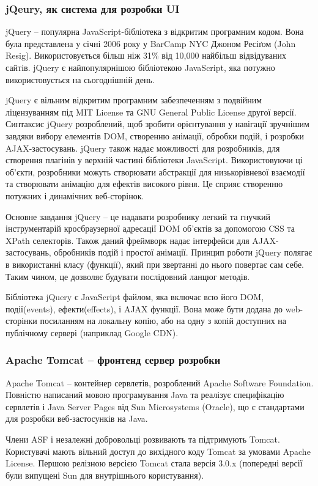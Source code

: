 \subsubsection{jQeury, як система для розробки UI}
\par jQuery -- популярна JavaScript-бібліотека з відкритим програмним кодом. Вона була представлена у січні 2006 року у BarCamp NYC Джоном Ресіґом (John Resig). Використовується більш ніж 31\% від 10,000 найбільш відвідуваних сайтів. jQuery є найпопулярнішою бібліотекою JavaScript, яка потужно використовується на сьогоднішній день\cite{jquery_usage}.
\par jQuery є вільним відкритим програмним забезпеченням з подвійним ліцензуванням під MIT License та GNU General Public License другої версії. Синтаксис jQuery розроблений, щоб зробити орієнтування у навігації зручнішим завдяки вибору елементів DOM, створенню анімації, обробки подій, і розробки AJAX-застосувань. jQuery також надає можливості для розробників, для створення плагінів у верхній частині бібліотеки JavaScript. Використовуючи ці об'єкти, розробники можуть створювати абстракції для низькорівневої взаємодії та створювати анімацію для ефектів високого рівня. Це сприяє створенню потужних і динамічних веб-сторінок.
\par Основне завдання jQuery -- це надавати розробнику легкий та гнучкий інструментарій кросбраузерної адресації DOM об'єктів за допомогою CSS та XPath селекторів. Також даний фреймворк надає інтерфейси для AJAX-застосувань, обробників подій і простої анімації.
Принцип роботи jQuery полягає в використанні класу (функції), який при звертанні до нього повертає сам себе. Таким чином, це дозволяє будувати послідовний ланцюг методів.
\par Бібліотека jQuery є JavaScript файлом, яка включає всю його DOM, події(events), ефекти(effects), і AJAX функції. Вона може бути додана до web-сторінки посиланням на локальну копію, або на одну з копій доступних на публічному сервері (наприклад Google CDN).


\subsubsection{Apache Tomcat -- фронтенд сервер розробки}
\par Apache Tomcat -- контейнер сервлетів, розроблений Apache Software Foundation. Повністю написаний мовою програмування Java та реалізує специфікацію сервлетів і Java Server Pages від Sun Microsystems (Oracle), що є стандартами для розробки веб-застосунків на Java.
\par Члени ASF і незалежні добровольці розвивають та підтримують Tomcat. Користувачі мають вільний доступ до вихідного коду Tomcat за умовами Apache License. Першою релізною версією Tomcat стала версія 3.0.x (попередні версії були випущені Sun для внутрішнього користування).



